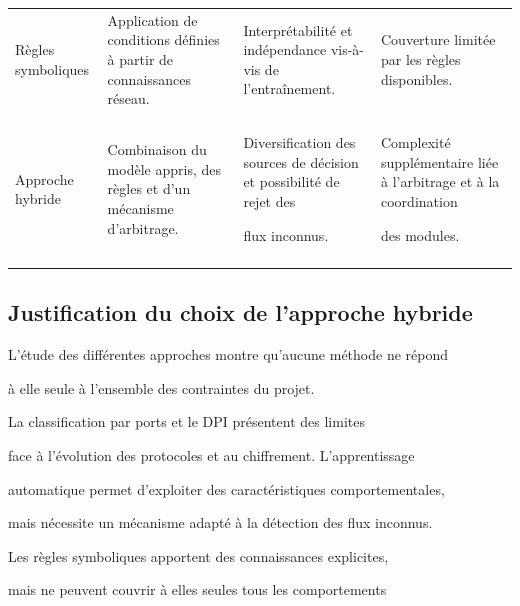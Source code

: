 \begin{table}[H]
\begin{tabularx}{\textwidth}{|p{2.5cm}|Y|Y|Y|}
Règles symboliques &

Application de conditions définies à partir de connaissances réseau. &

Interprétabilité et indépendance vis-à-vis de l'entraînement. &

Couverture limitée par les règles disponibles. \\\\

\hline



Approche hybride &

Combinaison du modèle appris, des règles et d'un mécanisme d'arbitrage. &

Diversification des sources de décision et possibilité de rejet des

flux inconnus. &

Complexité supplémentaire liée à l'arbitrage et à la coordination

des modules. \\\\

\hline



\end{tabularx}

\end{table}



\subsection{Justification du choix de l'approche hybride}



L'étude des différentes approches montre qu'aucune méthode ne répond

à elle seule à l'ensemble des contraintes du projet.



La classification par ports et le DPI présentent des limites

face à l'évolution des protocoles et au chiffrement. L'apprentissage

automatique permet d'exploiter des caractéristiques comportementales,

mais nécessite un mécanisme adapté à la détection des flux inconnus.

Les règles symboliques apportent des connaissances explicites,

mais ne peuvent couvrir à elles seules tous les comportements

